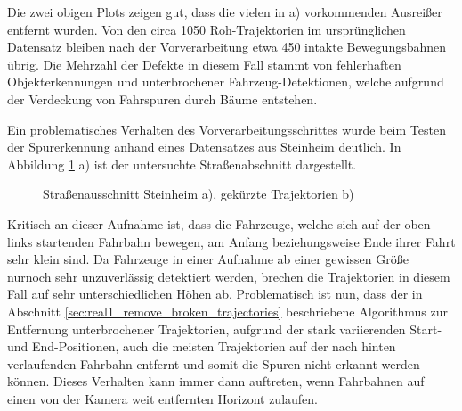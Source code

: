 Die zwei obigen Plots zeigen gut, dass die vielen in a) vorkommenden Ausreißer entfernt wurden. Von den
circa 1050 Roh-Trajektorien im ursprünglichen Datensatz bleiben nach der Vorverarbeitung etwa 450 intakte
Bewegungsbahnen übrig. Die Mehrzahl der Defekte in diesem Fall stammt von fehlerhaften Objekterkennungen
und unterbrochener Fahrzeug-Detektionen, welche aufgrund der Verdeckung von Fahrspuren durch Bäume entstehen.

Ein problematisches Verhalten des Vorverarbeitungsschrittes wurde beim Testen der Spurerkennung anhand eines
Datensatzes aus Steinheim deutlich. In Abbildung \ref{fig:results_horizon_problem} a) ist der
untersuchte Straßenabschnitt dargestellt.

\begin{figure}[H]
    \centering
    \qquad \qquad \qquad
    \caption[Problem Trajektorie-Enden am Horizont]{Straßenausschnitt Steinheim a), gekürzte Trajektorien b)}
    \label{fig:results_horizon_problem}
\end{figure}

Kritisch an dieser Aufnahme ist, dass die Fahrzeuge, welche sich auf der oben links startenden Fahrbahn bewegen,
am Anfang beziehungsweise Ende ihrer Fahrt sehr klein sind. Da Fahrzeuge in einer Aufnahme ab einer gewissen Größe
nurnoch sehr unzuverlässig detektiert werden, brechen die Trajektorien in diesem Fall auf sehr
unterschiedlichen Höhen ab.
Problematisch ist nun, dass der in Abschnitt \ref{sec:real1_remove_broken_trajectories} beschriebene Algorithmus
zur Entfernung unterbrochener Trajektorien, aufgrund der stark variierenden Start- und End-Positionen,
auch die meisten Trajektorien auf der nach hinten verlaufenden Fahrbahn entfernt und somit die Spuren
nicht erkannt werden können. Dieses Verhalten kann immer dann auftreten, wenn Fahrbahnen auf einen
von der Kamera weit entfernten Horizont zulaufen.


